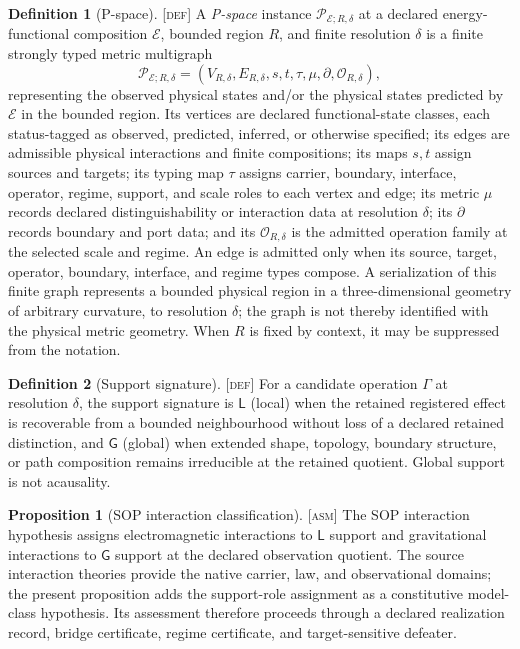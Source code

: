 \documentclass[11pt]{article}
\newcommand{\Pspace}{\ensuremath{\mathcal{P}}}
\newcommand{\Defn}{\textsc{[def]}}
\newcommand{\Asm}{\textsc{[asm]}}
\theoremstyle{definition}
\newtheorem{sdefinition}{Definition}
\newtheorem{sproposition}{Proposition}
\begin{document}
\begin{sdefinition}[P-space]
\label{def:pspace}
\Defn{} A \emph{P-space} instance $\Pspace_{\mathcal E;R,\delta}$ at a declared
energy-functional composition $\mathcal E$, bounded region $R$, and finite
resolution $\delta$ is a finite strongly typed metric multigraph
\begin{equation}
\Pspace_{\mathcal E;R,\delta}=
\left(V_{R,\delta},E_{R,\delta},s,t,\tau,\mu,\partial,\mathcal O_{R,\delta}\right),
\label{eq:pspace-instance-v15}
\end{equation}
representing the observed physical states and/or the physical states predicted by
$\mathcal E$ in the bounded region. Its vertices are declared functional-state
classes, each status-tagged as observed, predicted, inferred, or otherwise
specified; its edges are admissible physical interactions and finite compositions;
its maps $s,t$ assign sources and targets; its typing map $\tau$ assigns carrier,
boundary, interface, operator, regime, support, and scale roles to each vertex and
edge; its metric $\mu$ records declared distinguishability or interaction data at
resolution $\delta$; its $\partial$ records boundary and port data; and its
$\mathcal O_{R,\delta}$ is the admitted operation family at the selected scale and
regime. An edge is admitted only when its source, target, operator, boundary,
interface, and regime types compose. A serialization of this finite graph
represents a bounded physical region in a three-dimensional geometry of arbitrary
curvature, to resolution $\delta$; the graph is not thereby identified with the
physical metric geometry. When $R$ is fixed by context, it may be suppressed from
the notation.
\end{sdefinition}

\begin{sdefinition}[Support signature]\label{def:support}
\Defn{} For a candidate operation $\Gamma$ at resolution $\delta$, the support
signature is $\mathsf{L}$ (local) when the retained registered effect is
recoverable from a bounded neighbourhood without loss of a declared retained
distinction, and $\mathsf{G}$ (global) when extended shape, topology, boundary
structure, or path composition remains irreducible at the retained quotient. Global
support is not acausality.
\end{sdefinition}

\begin{sproposition}[SOP interaction classification]
\label{prop:sop-interaction-classification}
\Asm{} The SOP interaction hypothesis assigns electromagnetic interactions to
$\mathsf{L}$ support and gravitational interactions to $\mathsf{G}$ support at the
declared observation quotient. The source interaction theories provide the native
carrier, law, and observational domains; the present proposition adds the
support-role assignment as a constitutive model-class hypothesis. Its assessment
therefore proceeds through a declared realization record, bridge certificate,
regime certificate, and target-sensitive defeater.
\end{sproposition}
\end{document}
